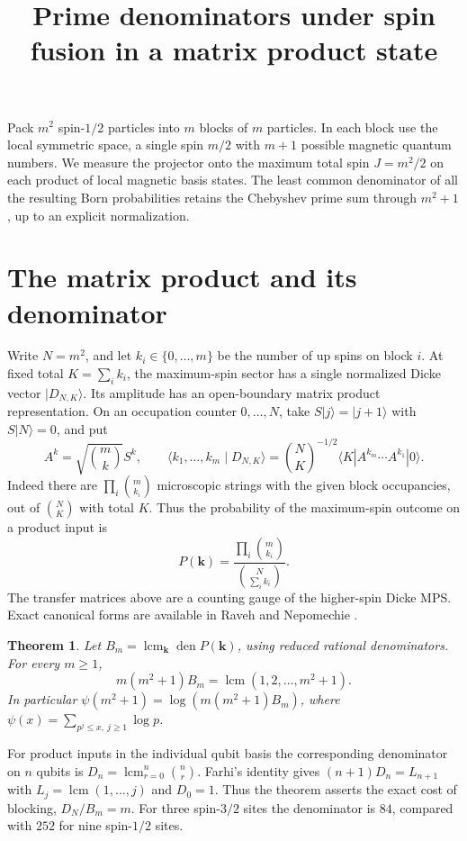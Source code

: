 \documentclass[11pt]{article}
\title{Prime denominators under spin fusion in a matrix product state}
\date{}
\newcommand{\lcm}{\operatorname{lcm}}
\newcommand{\den}{\operatorname{den}}
\newtheorem*{theorem}{Theorem}
\begin{document}
\maketitle
\vspace{-2.8em}

Pack $m^2$ spin-$1/2$ particles into $m$ blocks of $m$ particles. In each block use the local symmetric space, a single spin $m/2$ with $m+1$ possible magnetic quantum numbers. We measure the projector onto the maximum total spin $J=m^2/2$ on each product of local magnetic basis states. The least common denominator of all the resulting Born probabilities retains the Chebyshev prime sum through $m^2+1$, up to an explicit normalization.

\section*{The matrix product and its denominator}
Write $N=m^2$, and let $k_i\in\{0,\ldots,m\}$ be the number of up spins on block $i$. At fixed total $K=\sum_i k_i$, the maximum-spin sector has a single normalized Dicke vector $|D_{N,K}\rangle$. Its amplitude has an open-boundary matrix product representation. On an occupation counter $0,\ldots,N$, take $S|j\rangle=|j+1\rangle$ with $S|N\rangle=0$, and put
\[
 A^k=\sqrt{\binom{m}{k}}S^k,\qquad
 \langle k_1,\ldots,k_m\mid D_{N,K}\rangle
 =\binom{N}{K}^{-1/2}\langle K| A^{k_m}\cdots A^{k_1}|0\rangle .
\]
Indeed there are $\prod_i\binom{m}{k_i}$ microscopic strings with the given block occupancies, out of $\binom{N}{K}$ with total $K$. Thus the probability of the maximum-spin outcome on a product input is
\[
 P(\mathbf k)=\frac{\prod_i\binom{m}{k_i}}{\binom{N}{\sum_i k_i}}.
\]
The transfer matrices above are a counting gauge of the higher-spin Dicke MPS. Exact canonical forms are available in Raveh and Nepomechie \cite{mps}.

\begin{theorem}
Let $B_m=\lcm_{\mathbf k}\den P(\mathbf k)$, using reduced rational denominators. For every $m\ge1$,
\[
 \boxed{\quad m(m^2+1) B_m=\lcm(1,2,\ldots,m^2+1).\quad}
\]
In particular $\psi(m^2+1)=\log(m(m^2+1)B_m)$, where $\psi(x)=\sum_{p^j\le x,\ j\ge1}\log p$.
\end{theorem}

For product inputs in the individual qubit basis the corresponding denominator on $n$ qubits is $D_n=\lcm_{r=0}^n\binom nr$. Farhi's identity \cite{farhi} gives $(n+1)D_n=L_{n+1}$ with $L_j=\lcm(1,\ldots,j)$ and $D_0=1$. Thus the theorem asserts the exact cost of blocking, $D_N/B_m=m$. For three spin-$3/2$ sites the denominator is $84$, compared with $252$ for nine spin-$1/2$ sites.
\end{document}

